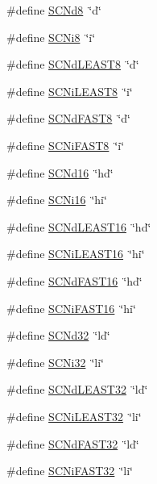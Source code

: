 \begin{DoxyCompactItemize}
\#define \hyperlink{a00113_abf98c3a9ad120b11ec2911b9398e3f2f}{S\+C\+Nd8}~\char`\"{}d\char`\"{}
\item 
\#define \hyperlink{a00113_a535485ea35661ff75a8d2bc0d2ebe807}{S\+C\+Ni8}~\char`\"{}i\char`\"{}
\item 
\#define \hyperlink{a00113_ab0af8c396d9c885950d423f8dee54164}{S\+C\+Nd\+L\+E\+A\+S\+T8}~\char`\"{}d\char`\"{}
\item 
\#define \hyperlink{a00113_a1a0b88bf6f131db927f2e7f1f6abb644}{S\+C\+Ni\+L\+E\+A\+S\+T8}~\char`\"{}i\char`\"{}
\item 
\#define \hyperlink{a00113_a6dc7d2f030d25e79ae8398088161b860}{S\+C\+Nd\+F\+A\+S\+T8}~\char`\"{}d\char`\"{}
\item 
\#define \hyperlink{a00113_ac864120101e01707ca52c0976b4e539a}{S\+C\+Ni\+F\+A\+S\+T8}~\char`\"{}i\char`\"{}
\item 
\#define \hyperlink{a00113_a35974d44b5dcebcb222b8e2c1384241d}{S\+C\+Nd16}~\char`\"{}hd\char`\"{}
\item 
\#define \hyperlink{a00113_a7b8508989273ad152f9b3b7cd4db6eee}{S\+C\+Ni16}~\char`\"{}hi\char`\"{}
\item 
\#define \hyperlink{a00113_a10db5de9c84ccfa6dc0e487dd72051f3}{S\+C\+Nd\+L\+E\+A\+S\+T16}~\char`\"{}hd\char`\"{}
\item 
\#define \hyperlink{a00113_a14ec2649667b53ff91a1103c02975837}{S\+C\+Ni\+L\+E\+A\+S\+T16}~\char`\"{}hi\char`\"{}
\item 
\#define \hyperlink{a00113_a09c9f36f654aa50a548d7820421cdc57}{S\+C\+Nd\+F\+A\+S\+T16}~\char`\"{}hd\char`\"{}
\item 
\#define \hyperlink{a00113_aad333b5bea32321b312a3b4967ff357f}{S\+C\+Ni\+F\+A\+S\+T16}~\char`\"{}hi\char`\"{}
\item 
\#define \hyperlink{a00113_a2b7ab77ff6ede9c3c285b714496f77e2}{S\+C\+Nd32}~\char`\"{}ld\char`\"{}
\item 
\#define \hyperlink{a00113_a52cfc41a1e5ad73788faebbfeb9c14b0}{S\+C\+Ni32}~\char`\"{}li\char`\"{}
\item 
\#define \hyperlink{a00113_ae36c293972a5b770349d74f2c0cfa52f}{S\+C\+Nd\+L\+E\+A\+S\+T32}~\char`\"{}ld\char`\"{}
\item 
\#define \hyperlink{a00113_a39be8ffb41be80bc951e955f111e4121}{S\+C\+Ni\+L\+E\+A\+S\+T32}~\char`\"{}li\char`\"{}
\item 
\#define \hyperlink{a00113_add733be35bef9dcef225edc99ade9e33}{S\+C\+Nd\+F\+A\+S\+T32}~\char`\"{}ld\char`\"{}
\item 
\#define \hyperlink{a00113_a4739f89fa519cd77097677bf33320091}{S\+C\+Ni\+F\+A\+S\+T32}~\char`\"{}li\char`\"{}

\end{DoxyCompactItemize}
